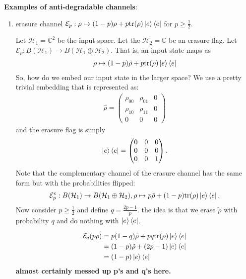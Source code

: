 \documentclass[../../note.tex]{subfiles}
\begin{document}
\noindent \textbf{Examples of anti-degradable channels}:
\begin{enumerate}
    \item erasure channel $\mathcal{E}_p: \rho \mapsto (1-p)\rho + p \text{tr}(\rho) \ket{e}\bra{e}$ for $p\geq \frac{1}{2}$. 
    
    Let $\mathcal{H}_1 = \mathbb{C}^2$ be the input space. Let the $\mathcal{H}_2=\mathbb{C}$ be an erasure flag. Let $\mathcal{E}_p : B(\mathcal{H}_1) \rightarrow B(\mathcal{H}_1 \oplus \mathcal{H}_2)$. That is, an input state maps as
    \begin{align}
        \rho \mapsto (1-p) \tilde{\rho} + p \text{tr}(\rho) \ket{e}\bra{e}
    \end{align}
    So, how do we embed our input state in the larger space? We use a pretty trivial embedding that is represented as:
    \begin{align}
        \hat{\rho} = \begin{pmatrix}
        \rho_{00} & \rho_{01} & 0 \\
        \rho_{10} & \rho_{11} & 0 \\
        0 & 0 & 0 
        \end{pmatrix}
    \end{align}
    and the erasure flag is simply
    \begin{align}
        \ket{e}\bra{e} =  \begin{pmatrix}
        0 & 0 & 0 \\
        0 & 0 & 0 \\
        0 & 0 & 1
        \end{pmatrix}.
    \end{align}
    Note that the complementary channel of the erasure channel has the same form but with the probabilities flipped:
    \begin{align}
        \mathcal{E}^c_p: B(\mathcal{H}_1) \rightarrow B(\mathcal{H}_1 \oplus \mathcal{H}_2 ), \rho \mapsto p \tilde{\rho} + (1-p) \text{tr}(\rho) \ket{e}\bra{e}.
    \end{align}
    Now consider $p\geq \frac{1}{2}$ and define $q=\frac{2p-1}{p}$. the idea is that we erase $\tilde{\rho}$ with probability $q$ and do nothing with $\ket{e}\bra{e}$.
    
    \begin{align}
        \mathcal{E}_q (p\rho) &= p(1-q) \tilde{\rho} + p q \text{tr}(\rho) \ket{e}\bra{e} \\
        &= (1-p) \tilde{\rho} + (2p-1) \ket{e}\bra{e} \\
        &= (1-p) \ket{e}\bra{e}
    \end{align}
    \textbf{almost certainly messed up p's and q's here.}
    

\end{enumerate}
\end{document}
